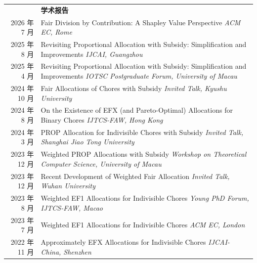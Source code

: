\documentclass[UTF8, fontset=none, letterpaper, 11pt]{ctexart}
\newcommand{\headingfont}{\Large\bfseries\color{OliveGreen}}
\newenvironment{SectionTable}[1]{
  \renewcommand*{\arraystretch}{1.2}
  \setlength{\tabcolsep}{10pt}
  \begin{longtable}{Rp{5.2in}} & #1 \\}
{\end{longtable}\vspace{-1cm}}
\begin{document}
\begin{SectionTable}{\headingfont 学术报告}
2026 年 7 月 & Fair Division by Contribution: A Shapley Value Perspective \newline
\textit{ACM EC, Rome} \\

2025 年 8 月 & Revisiting Proportional Allocation with Subsidy: Simplification and Improvements \newline
\textit{IJCAI, Guangzhou} \\

2025 年 4 月 & Revisiting Proportional Allocation with Subsidy: Simplification and Improvements \newline
\textit{IOTSC Postgraduate Forum, University of Macau} \\

2024 年 10 月 &
Fair Allocations of Chores with Subsidy \newline
\textit{Invited Talk, Kyushu University} \\

2024 年 8 月 &
On the Existence of EFX (and Pareto-Optimal) Allocations for Binary Chores\newline
\textit{IJTCS-FAW, Hong Kong} \\

2024 年 3 月 &
PROP Allocation for Indivisible Chores with Subsidy \newline
\textit{Invited Talk, Shanghai Jiao Tong University} \\

2023 年 12 月 &
Weighted PROP Allocations with Subsidy \newline
\textit{Workshop on Theoretical Computer Science, University of Macau} \\

2023 年 12 月 &
Recent Development of Weighted Fair Allocation \newline
\textit{Invited Talk, Wuhan University} \\

2023 年 8 月 &
Weighted EF1 Allocations for Indivisible Chores \newline
\textit{Young PhD Forum, IJTCS-FAW, Macao} \\

2023 年 7 月 &
Weighted EF1 Allocations for Indivisible Chores \newline
\textit{ACM EC, London} \\

2022 年 11 月 &
Approximately EFX Allocations for Indivisible Chores \newline
\textit{IJCAI-China, Shenzhen} \\
\end{SectionTable}
\end{document}
